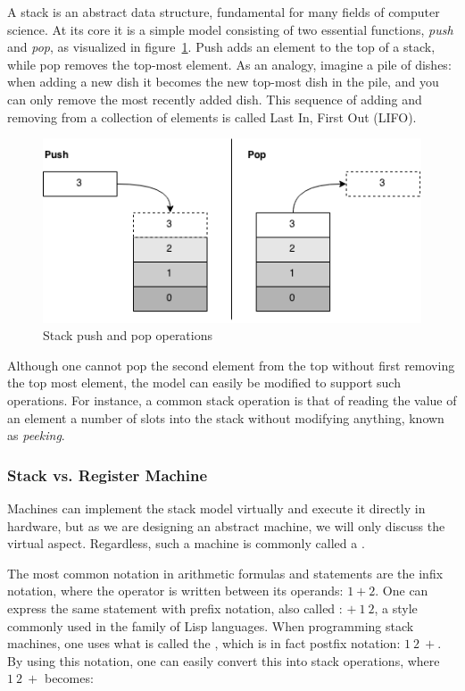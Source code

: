 A stack is an abstract data structure, fundamental for many fields of computer
science. At its core it is a simple model consisting of two essential functions,
{\it push} and {\it pop}, as visualized in figure~\ref{fig:stack}. Push adds an
element to the top of a stack, while pop removes the top-most element. As an
analogy, imagine a pile of dishes: when adding a new dish it becomes the new
top-most dish in the pile, and you can only remove the most recently added
dish. This sequence of adding and removing from a collection of elements is
called Last In, First Out (LIFO).
\begin{figure}[h]
  \centering
  \includegraphics[scale=0.6]{images/stack.png}
  \caption{Stack push and pop operations}
  \label{fig:stack}
\end{figure}

Although one cannot pop the second element from the top without first removing
the top most element, the model can easily be modified to support such
operations. For instance, a common stack operation is that of reading the value
of an element a number of slots into the stack without modifying anything, known
as {\it peeking}.

\subsubsection{Stack vs. Register Machine}

Machines can implement the stack model virtually and execute it directly in
hardware, but as we are designing an abstract machine, we will only discuss the
virtual aspect. Regardless, such a machine is commonly called a . %

The most common notation in arithmetic formulas and statements are the infix
notation, where the operator is written between its operands: $1 + 2$. One can
express the same statement with prefix notation, also called : $+\ 1\ 2$, a style commonly used in the family of Lisp
languages. When programming stack machines, one uses what is called the
, which is in fact postfix notation: $1\ 2\ +$. By
using this notation, one can easily convert this into stack operations, where
$1\ 2\ +$ becomes:
\begin{stackops}
\end{stackops}


